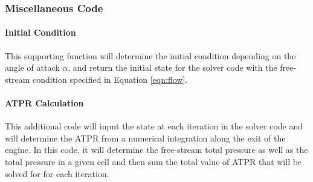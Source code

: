 \subsubsection{Miscellaneous Code}
\paragraph{Initial Condition} This supporting function will determine the initial condition depending on the angle of attack $\alpha$, and return the initial state for the solver code with the free-stream condition specified in Equation \ref{eqn:flow}.

\paragraph{ATPR Calculation} This additional code will input the state at each iteration in the solver code and will determine the ATPR from a numerical integration along the exit of the engine. In this code, it will determine the free-stream total pressure as well as the total pressure in a given cell and then sum the total value of ATPR that will be solved for for each iteration.